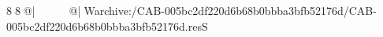 8  8  @|                                                   @| W   archive:/CAB-005bc2df220d6b68b0bbba3bfb52176d/CAB-005bc2df220d6b68b0bbba3bfb52176d.resS 